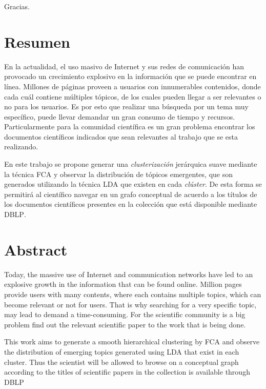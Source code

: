 \documentclass[12pt,oneside,letterpaper]{book}
\newcommand{\eng}[1]{\textit{#1}\xspace}			%
\newcommand{\abr}[1]{\textsc{#1}\xspace}           %
\theoremstyle{definition}
\begin{document}
Gracias.


\clearpage

\section*{Resumen}
\thispagestyle{empty}
En la actualidad, el uso masivo de Internet y sus redes de comunicación han provocado un crecimiento explosivo en la información que se puede encontrar en línea. Millones de páginas proveen a usuarios con innumerables contenidos, donde cada cuál contiene múltiples tópicos, de los cuales pueden llegar a ser relevantes o no para los usuarios. Es por esto que realizar una búsqueda por un tema muy específico, puede llevar demandar un gran consumo de tiempo y recursos. Particularmente para la comunidad científica es un gran problema encontrar los documentos científicos indicados que sean relevantes al trabajo que se esta realizando.

En este trabajo se propone generar una \eng{clusterización} jerárquica suave mediante la técnica \abr{FCA} y observar la distribución de tópicos emergentes, que son generados utilizando la técnica \abr{LDA} que existen en cada \eng{clúster}. De esta forma se permitirá al científico navegar en un grafo conceptual de acuerdo a los títulos de los documentos científicos presentes en la colección que está disponible mediante \abr{DBLP}.
\clearpage

\section*{Abstract}
\thispagestyle{empty}
Today, the massive use of Internet and communication networks have led to an explosive growth in the information that can be found online. Million pages provide users with many contents, where each contains multiple topics, which can become relevant or not for users. That is why searching for a very specific topic, may lead to demand a time-consuming. For the scientific community is a big problem find out the relevant scientific paper to the work that is being done.

This work aims to generate a smooth hierarchical clustering by \abr{FCA} and observe the distribution of emerging topics generated using  \abr{LDA} that exist in each cluster. Thus the scientist will be allowed to browse on a conceptual graph according to the titles of scientific papers in the collection is available through \abr{DBLP}
\clearpage
\end{document}
